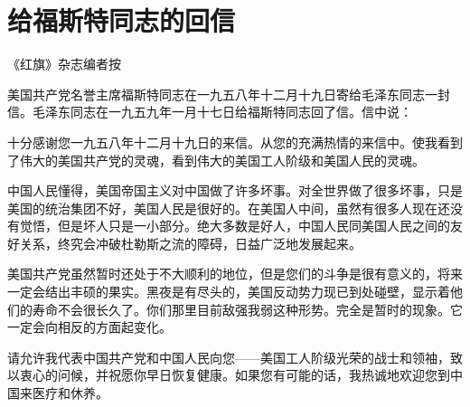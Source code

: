 \section[给福斯特同志的回信（一九五九年一月十七日）]{给福斯特同志的回信}


《红旗》杂志编者按

美国共产党名誉主席福斯特同志在一九五八年十二月十九日寄给毛泽东同志一封信。毛泽东同志在一九五九年一月十七日给福斯特同志回了信。信中说：

十分感谢您一九五八年十二月十九日的来信。从您的充满热情的来信中。使我看到了伟大的美国共产党的灵魂，看到伟大的美国工人阶级和美国人民的灵魂。

中国人民懂得，美国帝国主义对中国做了许多坏事。对全世界做了很多坏事，只是美国的统治集团不好，美国人民是很好的。在美国人中间，虽然有很多人现在还没有觉悟，但是坏人只是一小部分。绝大多数是好人，中国人民同美国人民之间的友好关系，终究会冲破杜勒斯之流的障碍，日益广泛地发展起来。

美国共产党虽然暂时还处于不大顺利的地位，但是您们的斗争是很有意义的，将来一定会结出丰硕的果实。黑夜是有尽头的，美国反动势力现已到处碰壁，显示着他们的寿命不会很长久了。你们那里目前敌强我弱这种形势。完全是暂时的现象。它一定会向相反的方面起变化。

请允许我代表中国共产党和中国人民向您——美国工人阶级光荣的战士和领袖，致以衷心的问候，并祝愿你早日恢复健康。如果您有可能的话，我热诚地欢迎您到中国来医疗和休养。


